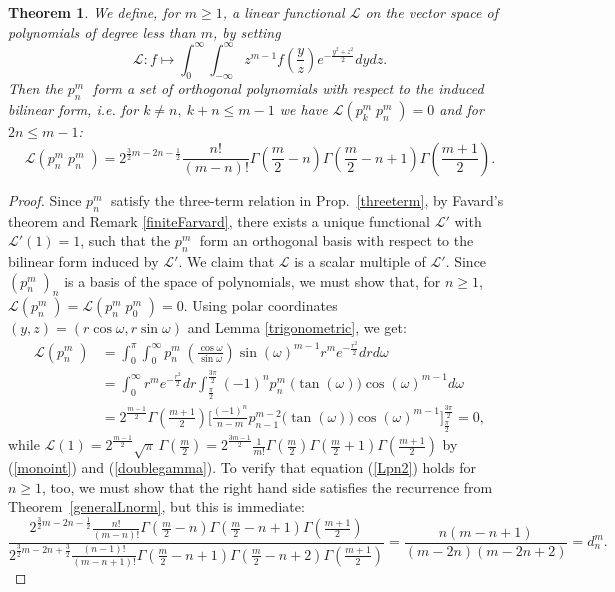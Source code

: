\documentclass{amsart}
\newcommand{\ie}{{\it i.e. }}
\newcommand{\p}[2]{p_{#1}^{#2}\;\!\!}
\renewcommand{\L}{\mathcal{L}}
\theoremstyle{plain}
\newtheorem{theorem}{Theorem}[section]
\theoremstyle{definition}
\theoremstyle{remark}
\begin{document}
\begin{theorem} \label{pthm}We define, for $m\geq 1$, a linear functional $\L$ on the vector space of polynomials of degree less than $m$, by setting
\begin{equation}
\L: f \longmapsto \int_0^\infty\!\!\! \int_{-\infty}^\infty z^{m-1}f\left(\frac{y}{z}\right) e^{-\frac{y^2+z^2}{2}} dydz.
\end{equation}
Then the $\p{n}{m}$ form a set of orthogonal polynomials with respect to the induced bilinear form, \ie for $k\neq n,\ k\!+\! n\leq m\!-\!1$ we have $\L(\p{k}{m}\p{n}{m})=0$ and for $2n\leq m\!-\!1$:
\begin{equation} \label{Lpn2}
\L(\p{n}{m}\p{n}{m}) = 2^{\frac{3}{2}m-2n-\frac{1}{2}}  \frac{n!}{(m-n)!}
\Gamma\left(\frac{m}{2}-n\right)\Gamma\left(\frac{m}{2}-n+1\right)\Gamma\left(\frac{m+1}{2}\right).
\end{equation}
\end{theorem}
\begin{proof}
Since $\p{n}{m}$ satisfy the three-term relation in Prop.~\ref{threeterm}, by Favard's theorem and Remark \ref{finiteFarvard}, there exists a unique functional $\L'$ with $\L'(1)=1$, such that the $\p{n}{m}$ form an orthogonal basis with respect to the bilinear form induced by $\L'$. We claim that $\L$ is a scalar multiple of $\L'$.
Since $(\p{n}{m})_{n} $ is a basis of the space of polynomials, we must show that, for $n\geq 1$, $\L(\p{n}{m}) = \L(\p{n}{m}\p{0}{m}) =0$.
Using polar coordinates $(y,z) = (r\cos\omega,r\sin\omega)$ and Lemma \ref{trigonometric}, we get:
\begin{align*}
\L(\p{n}{m}) &= \int_0^\pi\!\!\int_0^\infty\p{n}{m}\!\left(\tfrac{\cos\omega}{\sin\omega}\right)\sin(\omega)^{m-1} r^m e^{-\frac{r^2}{2}}dr d\omega \\
&=\int_0^\infty r^m e^{-\frac{r^2}{2}}dr \int_{\frac{\pi}{2}}^{\frac{3\pi}{2}} (-1)^n \p{n}{m}\big(\tan(\omega)\big)\cos(\omega)^{m-1}d\omega\\
&= 2^{\frac{m-1}{2}}\Gamma\left(\tfrac{m+1}{2}\right)\Big[\tfrac{(-1)^n}{n-m}p_{n-1}^{m-2}\big(\tan(\omega)\big)\cos(\omega)^{m-1} \Big]_{\frac{\pi}{2}}^{\frac{3\pi}{2}} =0,
\end{align*}
while $\L(1) = 2^{\frac{m-1}{2}}\sqrt{\pi}\,\Gamma\!\left(\frac{m}{2}\right)=2^{\frac{3m-1}{2}}  \frac{1}{m!}
\Gamma\left(\frac{m}{2}\right)\Gamma\left(\frac{m}{2}+1\right)\Gamma\left(\frac{m+1}{2}\right)$ by (\ref{monoint}) and (\ref{doublegamma}). To verify that equation (\ref{Lpn2}) holds for $n\geq 1$, too, we must show that the right hand side satisfies the recurrence from Theorem~\ref{generalLnorm}, but this is immediate:
$$ 
\frac{2^{\frac{3}{2}m\!-\!2n\!-\!\frac{1}{2}}  \frac{n!}{(m\!-\!n)!}
\Gamma\!\left(\frac{m}{2}\!-\!n\right)\Gamma\!\left(\frac{m}{2}\!-\!n\!+\!1\right)\Gamma\!\left(\frac{m+1}{2}\right)}{
2^{\frac{3}{2}m\!-\!2n\!+\!\frac{3}{2}}  \frac{(n\!-\!1)!}{(m\!-\!n\!+\!1)!}
\Gamma\!\left(\frac{m}{2}\!-\!n\!+\!1\right)\Gamma\!\left(\frac{m}{2}\!-\!n\!+\!2\right)\Gamma\!\left(\frac{m+1}{2}\right)} = \frac{n(m\!-\!n\!+\!1)}{(m\!-\!2n)(m\!-\!2n\!+\!2)} =d_n^m.
$$
\end{proof}
\end{document}
